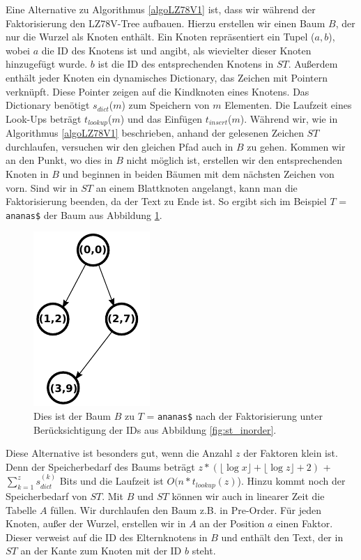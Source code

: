 \documentclass[a4paper,11pt]{scrartcl}%
\theoremstyle{change}
\theoremstyle{nonumberplain}
\theoremstyle{change}
\theoremstyle{nonumberplain}
\theoremstyle{change}
\theoremstyle{nonumberplain}
\begin{document}
		Eine Alternative zu Algorithmus \ref{algoLZ78V1} ist, dass wir während der Faktorisierung den LZ78V-Tree aufbauen. Hierzu erstellen wir einen Baum $B$, der nur die Wurzel als Knoten enthält. Ein Knoten repräsentiert ein Tupel ($a ,b$), wobei $a$ die ID des Knotens ist und angibt, als wievielter dieser Knoten hinzugefügt wurde. $b$ ist die ID des entsprechenden Knotens in $ST$. Außerdem enthält jeder Knoten ein dynamisches Dictionary, das Zeichen mit Pointern verknüpft. Diese Pointer zeigen auf die Kindknoten eines Knotens. Das Dictionary benötigt $s_{dict}$($m$) zum Speichern von $m$ Elementen. Die Laufzeit eines Look-Ups beträgt $t_{lookup}$($m$) und das Einfügen $t_{insert}$($m$). Während wir, wie in Algorithmus \ref{algoLZ78V1} beschrieben, anhand der gelesenen Zeichen $ST$ durchlaufen, versuchen wir den gleichen Pfad auch in $B$ zu gehen. Kommen wir an den Punkt, wo dies in $B$ nicht möglich ist, erstellen wir den entsprechenden Knoten in $B$ und beginnen in beiden Bäumen mit dem nächsten Zeichen von vorn. Sind wir in $ST$ an einem Blattknoten angelangt, kann man die Faktorisierung beenden, da der Text zu Ende ist. So ergibt sich im Beispiel $T$ = \texttt{ananas\$} der Baum aus Abbildung \ref{fig:ausschnitt}. 
			\begin{figure}[h]
				\centering
				\includegraphics[scale=0.8]{ananas_LZ78VTree(ausschnitt)}
				\caption{Dies ist der Baum $B$ zu $T$ = \texttt{ananas\$} nach der Faktorisierung unter Berücksichtigung der IDs aus Abbildung \ref{fig:st_inorder}.}
				\label{fig:ausschnitt}
			\end{figure}
		Diese Alternative ist besonders gut, wenn die Anzahl $z$ der Faktoren klein ist. Denn der Speicherbedarf des Baums beträgt $z * (\lfloor\log x\rfloor + \lfloor\log z\rfloor + 2)$ + $\sum_{k=1}^z s_{dict}^{(k)}$ Bits und die Laufzeit ist $O(n * t_{lookup}(z)$). Hinzu kommt noch der Speicherbedarf von $ST$.
		Mit $B$ und $ST$ können wir auch in linearer Zeit die Tabelle $A$ füllen. Wir durchlaufen den Baum z.B. in Pre-Order. Für jeden Knoten, außer der Wurzel,  erstellen wir in $A$ an der Position $a$ einen Faktor. Dieser verweist auf die ID des Elternknotens in $B$ und enthält den Text, der in $ST$ an der Kante zum Knoten mit der ID $b$ steht.
		
\end{document}
